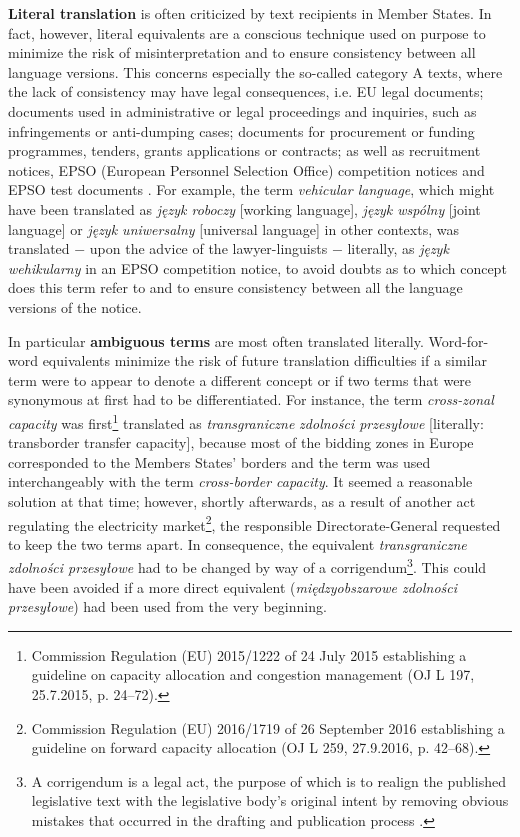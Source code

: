 \documentclass[output=paper]{langsci/langscibook}
\begin{document}
\textbf{Literal translation} is often criticized by text recipients in Member States. In fact, however, literal equivalents are a conscious technique used on purpose to minimize the risk of misinterpretation and to ensure consistency between all language versions. This concerns especially the so-called category A texts, where the lack of consistency may have legal consequences, i.e. EU legal documents; documents used in administrative or legal proceedings and inquiries, such as infringements or anti-dumping cases; documents for procurement or funding programmes, tenders, grants applications or contracts; as well as recruitment notices, EPSO (European Personnel Selection Office) competition notices and EPSO test documents \citep{DGT2017}. For example, the term \textit{vehicular language}, which might have been translated as \textit{język roboczy} [working language], \textit{język wspólny} [joint language] or \textit{język uniwersalny} [universal language] in other contexts, was translated $-$ upon the advice of the lawyer-linguists $-$ literally, as \textit{język wehikularny} in an EPSO competition notice, to avoid doubts as to which concept does this term refer to and to ensure consistency between all the language versions of the notice. 

In particular \textbf{ambiguous terms} are most often translated literally. Word-for-word equivalents minimize the risk of future translation difficulties if a similar term were to appear to denote a different concept or if two terms that were synonymous at first had to be differentiated. For instance, the term \textit{cross-zonal capacity} was first\footnote{Commission Regulation (EU) 2015/1222 of 24 July 2015 establishing a guideline on capacity allocation and congestion management (OJ L 197, 25.7.2015, p. 24–72).} translated as \textit{transgraniczne} \textit{zdolności przesyłowe} [literally: transborder transfer capacity], because most of the bidding zones in Europe corresponded to the Members States’ borders and the term was used interchangeably with the term \textit{cross-border capacity}. It seemed a reasonable solution at that time; however, shortly afterwards, as a result of another act regulating the electricity market\footnote{Commission Regulation (EU) 2016/1719 of 26 September 2016 establishing a guideline on forward capacity allocation (OJ L 259, 27.9.2016, p. 42–68).}, the responsible Directorate-General requested to keep the two terms apart. In consequence, the equivalent \textit{transgraniczne zdolności przesyłowe} had to be changed by way of a corrigendum\footnote{A corrigendum is a legal act, the purpose of which is to realign the published legislative text with the legislative body’s original intent by removing obvious mistakes that occurred in the drafting and publication process \citep[950]{Bobek2009}.}. This could have been avoided if a more direct equivalent (\textit{międzyobszarowe zdolności przesyłowe}) had been used from the very beginning.
\end{document}
